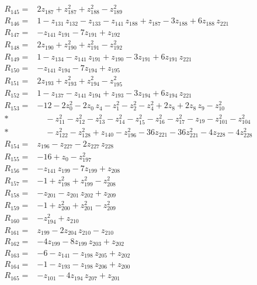 \begin{align*}
R_{145}={}& 2z_{187} + z_{187}^{2} + z_{188}^{2} - z_{189}^{2} \\[2pt]
R_{146}={}& 1 - z_{131}\,z_{132} - z_{133} - z_{141}\,z_{188} + z_{187} - 3z_{188} + 6z_{188}\,z_{221} \\[2pt]
R_{147}={}& -z_{141}\,z_{191} - 7z_{191} + z_{192} \\[2pt]
R_{148}={}& 2z_{190} + z_{190}^{2} + z_{191}^{2} - z_{192}^{2} \\[2pt]
R_{149}={}& 1 - z_{134} - z_{141}\,z_{191} + z_{190} - 3z_{191} + 6z_{191}\,z_{221} \\[2pt]
R_{150}={}& -z_{141}\,z_{194} - 7z_{194} + z_{195} \\[2pt]
R_{151}={}& 2z_{193} + z_{193}^{2} + z_{194}^{2} - z_{195}^{2} \\[2pt]
R_{152}={}& 1 - z_{137} - z_{141}\,z_{194} + z_{193} - 3z_{194} + 6z_{194}\,z_{221} \\[2pt]
R_{153}={}& -12 - 2z_{0}^{2} - 2z_{0}\,z_{4} - z_{1}^{2} - z_{2}^{2} - z_{4}^{2} + 2z_{8} + 2z_{8}\,z_{9} - z_{10}^{2} \\*
&\quad  - z_{11}^{2} - z_{12}^{2} - z_{13}^{2} - z_{14}^{2} - z_{15}^{2} - z_{16}^{2} - z_{17}^{2} - z_{19} - z_{101}^{2} - z_{104}^{2} \\*
&\quad  - z_{122}^{2} - z_{128}^{2} + z_{140} - z_{196}^{2} - 36z_{221} - 36z_{221}^{2} - 4z_{228} - 4z_{228}^{2} \\[2pt]
R_{154}={}& z_{196} - z_{227} - 2z_{227}\,z_{228} \\[2pt]
R_{155}={}& -16 + z_{0} - z_{197}^{2} \\[2pt]
R_{156}={}& -z_{141}\,z_{199} - 7z_{199} + z_{208} \\[2pt]
R_{157}={}& -1 + z_{198}^{2} + z_{199}^{2} - z_{208}^{2} \\[2pt]
R_{158}={}& -z_{201} - z_{201}\,z_{202} + z_{209} \\[2pt]
R_{159}={}& -1 + z_{200}^{2} + z_{201}^{2} - z_{209}^{2} \\[2pt]
R_{160}={}& -z_{194}^{2} + z_{210} \\[2pt]
R_{161}={}& z_{199} - 2z_{204}\,z_{210} - z_{210} \\[2pt]
R_{162}={}& -4z_{199} - 8z_{199}\,z_{203} + z_{202} \\[2pt]
R_{163}={}& -6 - z_{141} - z_{198}\,z_{205} + z_{202} \\[2pt]
R_{164}={}& -1 - z_{193} - z_{198}\,z_{206} + z_{200} \\[2pt]
R_{165}={}& -z_{101} - 4z_{194}\,z_{207} + z_{201} \\[2pt]

\end{align*}
